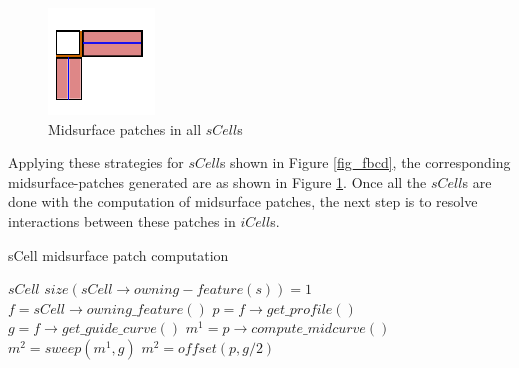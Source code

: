 \begin{figure}[h]
\centering 
\centering \includegraphics[width=0.35\linewidth]{../Common/images/MidsurfPatches.pdf}
\caption{Midsurface patches in all $sCell$s}
\label{fig_scells}
\end{figure}

Applying these strategies for $sCell$s shown in Figure \ref{fig_fbcd}, the corresponding midsurface-patches generated are as shown in Figure \ref{fig_scells}.  Once all the $sCell$s are done with the computation of midsurface patches, the next step is to resolve interactions  between these patches in $iCell$s.

\bigskip

	\begin{algorithm}[!h]
		\caption{sCell midsurface patch computation}
		\label{alg_MidsurfsCell}
		\begin{algorithmic}
			\REQUIRE $sCell$
			\ENSURE $size(sCell \rightarrow owning-feature(s)) = 1$
			\STATE $f = sCell \rightarrow owning\_feature()$
			\STATE $p = f \rightarrow get\_profile()$
			\STATE $g = f \rightarrow get\_guide\_curve()$
				\STATE $m^1 = p\rightarrow compute\_midcurve()$
				\STATE $m^2 = sweep(m^1 ,g)$
			\ELSE
				\STATE $m^2 = offset(p ,g/2)$
			\ENDIF
		\end{algorithmic}
	\end{algorithm}
	
